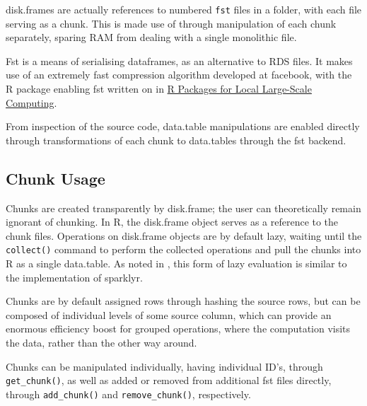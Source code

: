\documentclass[10pt,a4paper]{article}
\begin{document}
disk.frames are actually references to numbered \texttt{fst} files in
a folder, with each file serving as a chunk. This is made use of
through manipulation of each chunk separately, sparing RAM from
dealing with a single monolithic file\cite{zj19:_inges_data}.

Fst is a means of serialising dataframes, as an alternative to RDS
files\cite{klik19}. It makes use of an extremely fast compression
algorithm developed at facebook, with the R package enabling fst
written on in \href{survey-r-packages-for-local-large-scale-computing.pdf}{R
	Packages for Local Large-Scale Computing}.

From inspection of the source code, data.table manipulations are
enabled directly through transformations of each chunk to data.tables
through the fst backend.

\subsection{Chunk Usage}
\label{sec:making-chunks}

Chunks are created transparently by disk.frame; the user can
theoretically remain ignorant of chunking. In R, the disk.frame object
serves as a reference to the chunk files. Operations on disk.frame
objects are by default lazy, waiting until the \texttt{collect()}
command to perform the collected operations and pull the chunks into R
as a single data.table. As noted in
\cite{zj19:_simpl_verbs_lazy_evaluat}, this form of lazy evaluation is
similar to the implementation of sparklyr.

Chunks are by default assigned rows through hashing the source rows,
but can be composed of individual levels of some source column, which
can provide an enormous efficiency boost for grouped operations, where
the computation visits the data, rather than the other way around.

Chunks can be manipulated individually, having individual ID's,
through \texttt{get\_chunk()}, as well as added or removed from
additional fst files directly, through \texttt{add\_chunk()} and
\texttt{remove\_chunk()}, respectively.
\end{document}
